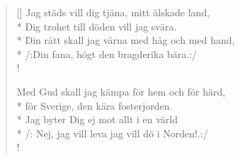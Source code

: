 \begin{verse}[\versewidth]
Jag städs vill dig tjäna, mitt älskade land,\\*
Dig trohet till döden vill jag svära.\\*
Din rätt skall jag värna med håg och med hand,\\*
/:Din fana, högt den bragderika bära.:/\\!


Med Gud skall jag kämpa för hem och för härd,\\*
för Sverige, den kära fosterjorden.\\*
Jag byter Dig ej mot allt i en värld\\*
/: Nej, jag vill leva jag vill dö i Norden!.:/\\!




\end{verse}

